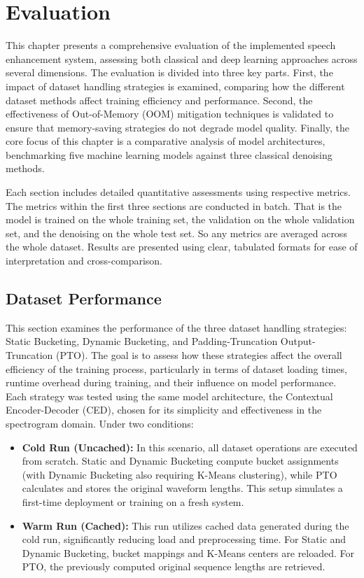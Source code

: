 \graphicspath{{content/chapters/7_evaluation/figures/}}
\chapter{Evaluation}
\label{chp:evaluation}

This chapter presents a comprehensive evaluation of the implemented speech enhancement system, assessing both classical and deep learning approaches across several dimensions. The evaluation is divided into three key parts. First, the impact of dataset handling strategies is examined, comparing how the different dataset methods affect training efficiency and performance. Second, the effectiveness of Out-of-Memory (OOM) mitigation techniques is validated to ensure that memory-saving strategies do not degrade model quality. Finally, the core focus of this chapter is a comparative analysis of model architectures, benchmarking five machine learning models against three classical denoising methods.

Each section includes detailed quantitative assessments using respective metrics. The metrics within the first three sections are conducted in batch. That is the model is trained on the whole training set, the validation on the whole validation set, and the denoising on the whole test set. So any metrics are averaged across the whole dataset. Results are presented using clear, tabulated formats for ease of interpretation and cross-comparison.

\section{Dataset Performance}
\label{sec:dataset_performance}

This section examines the performance of the three dataset handling strategies: Static Bucketing, Dynamic Bucketing, and Padding-Truncation Output-Truncation (PTO). The goal is to assess how these strategies affect the overall efficiency of the training process, particularly in terms of dataset loading times, runtime overhead during training, and their influence on model performance. Each strategy was tested using the same model architecture, the Contextual Encoder-Decoder (CED), chosen for its simplicity and effectiveness in the spectrogram domain. Under two conditions:

\begin{itemize}
    \item \textbf{Cold Run (Uncached):} In this scenario, all dataset operations are executed from scratch. Static and Dynamic Bucketing compute bucket assignments (with Dynamic Bucketing also requiring K-Means clustering), while PTO calculates and stores the original waveform lengths. This setup simulates a first-time deployment or training on a fresh system.
    
    \item \textbf{Warm Run (Cached):} This run utilizes cached data generated during the cold run, significantly reducing load and preprocessing time. For Static and Dynamic Bucketing, bucket mappings and K-Means centers are reloaded. For PTO, the previously computed original sequence lengths are retrieved.
\end{itemize}

